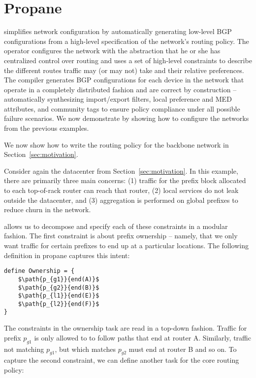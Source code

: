 \section{Propane}
\label{sec:propane}


\sysname simplifies network configuration by automatically generating low-level BGP configurations from a high-level specification of the network's routing policy. 
%
The operator configures the network with the abstraction that he or she has centralized control over routing and uses a set of high-level constraints to describe the different routes traffic may (or may not) take and their relative preferences. 
%
The \sysname compiler generates BGP configurations for each device in the network that operate in a completely distributed fashion and are correct by construction -- automatically synthesizing import/export filters, local preference and MED attributes, and community tags to ensure policy compliance under all possible failure scenarios.
%
We now demonstrate \sysname by showing how to configure the networks from the previous examples.


We now show how to write the routing policy for the backbone network in Section~\ref{sec:motivation}.



Consider again the datacenter from Section~\ref{sec:motivation}. In this example, there are primarily three main concerns: (1) traffic for the prefix block allocated to each top-of-rack router can reach that router, (2) local services do not leak outside the datacenter, and (3) aggregation is performed on global prefixes to reduce churn in the network. 

\sysname allows us to decompose and specify each of these constraints in a modular fashion. The first constraint is about prefix ownership -- namely, that we only want traffic for certain prefixes to end up at a particular locations. The following definition in propane captures this intent:

\begin{lstlisting}[mathescape=true]
define Ownership = {
    $\path{p_{g1}}{end(A)}$
    $\path{p_{g2}}{end(B)}$
    $\path{p_{l1}}{end(E)}$
    $\path{p_{l2}}{end(F)}$
}
\end{lstlisting}

The constraints in the ownership task are read in a top-down fashion. Traffic for prefix $p_{g1}$ is only allowed to to follow paths that end at router A. Similarly, traffic not matching $p_{g1}$, but which matches $p_{g2}$ must end at router B and so on. 
%
To capture the second constraint, we can define another task for the core routing policy:

